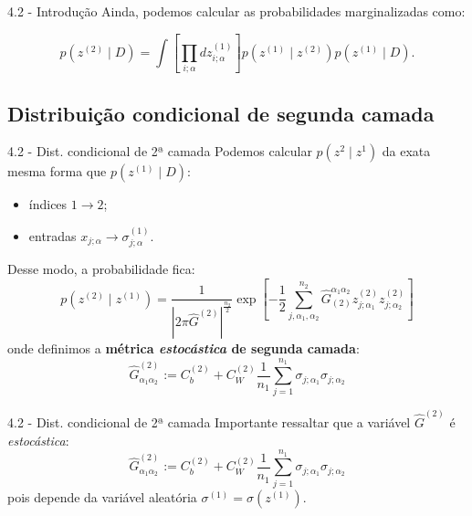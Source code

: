 \documentclass{beamer}
\begin{document}
\begin{frame}{4.2 - Introdução}
    Ainda, podemos calcular as probabilidades marginalizadas como:

    \begin{equation}
        p(z^{(2)} \mid D) = \int \left[\prod_{i;\alpha} dz^{(1)}_{i;\alpha}\right]p(z^{(1)} \mid z^{(2)}) p(z^{(1)} \mid D).
    \end{equation}

\end{frame}

\subsection{Distribuição condicional de segunda camada}
\begin{frame}
\tableofcontents[currentsubsection]
\end{frame}

\begin{frame}{4.2 - Dist. condicional de 2ª camada} 
    Podemos calcular $p(z^{2} \mid z^{1})$ da exata mesma forma que $p(z^{(1)} \mid D)$: \pause
    \begin{itemize}
        \item índices $1 \to 2$; \pause
        \item entradas $x_{j;\alpha} \to \sigma_{j;\alpha}^{(1)}$. \pause
    \end{itemize}

    Desse modo, a probabilidade fica:
    \begin{equation}\label{eq:pz2-dado-pz1}
        p(z^{(2)} \mid z^{(1)}) = \frac{1}{|2\pi \widehat G^{(2)}|^{\frac{n_2}{2}}} \exp \left[- \frac{1}{2} \sum_{j, \alpha_1, \alpha_2}^{n_2} \widehat G_{(2)}^{\alpha_1 \alpha_2} z^{(2)}_{j; \alpha_1} z^{(2)}_{j; \alpha_2}\right]
    \end{equation} 
    \pause
    onde definimos a \textbf{métrica \textit{estocástica} de segunda camada}:
    \begin{equation}
        \widehat G_{\alpha_1\alpha_2}^{(2)} := C_b^{(2)} + C_W^{(2)} \frac{1}{n_1} \sum_{j=1}^{n_1} \sigma_{j; \alpha_1} \sigma_{j; \alpha_2}
    \end{equation}
\end{frame}

\begin{frame}{4.2 - Dist. condicional de 2ª camada}
    Importante ressaltar que a variável $\widehat G^{(2)}$ é \textit{estocástica}: 
    \begin{equation}
        \widehat G_{\alpha_1\alpha_2}^{(2)} := C_b^{(2)} + C_W^{(2)} \frac{1}{n_1} \sum_{j=1}^{n_1} \sigma_{j; \alpha_1} \sigma_{j; \alpha_2}
    \end{equation}
    pois depende da variável aleatória $\sigma^{(1)} = \sigma(z^{(1)})$.
\end{frame}
\end{document}
